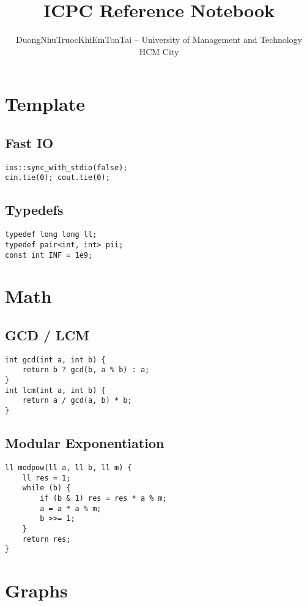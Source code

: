 \documentclass[11pt,a4paper,landscape]{article}
\title{\vspace{-2cm}ICPC Reference Notebook}
\author{DuongNhuTruocKhiEmTonTai -- University of Management and Technology HCM City}
\date{}
\begin{document}
\maketitle
\tableofcontents
\newpage

\begin{multicols}{3}

\section{Template}
\subsection{Fast IO}
\begin{lstlisting}
ios::sync_with_stdio(false);
cin.tie(0); cout.tie(0);
\end{lstlisting}
\subsection{Typedefs}
\begin{lstlisting}
typedef long long ll;
typedef pair<int, int> pii;
const int INF = 1e9;
\end{lstlisting}

\section{Math}
\subsection{GCD / LCM}
\begin{lstlisting}
int gcd(int a, int b) {
    return b ? gcd(b, a % b) : a;
}
int lcm(int a, int b) {
    return a / gcd(a, b) * b;
}
\end{lstlisting}
\subsection{Modular Exponentiation}
\begin{lstlisting}
ll modpow(ll a, ll b, ll m) {
    ll res = 1;
    while (b) {
        if (b & 1) res = res * a % m;
        a = a * a % m;
        b >>= 1;
    }
    return res;
}
\end{lstlisting}

\section{Graphs}

\end{multicols}
\end{document}
